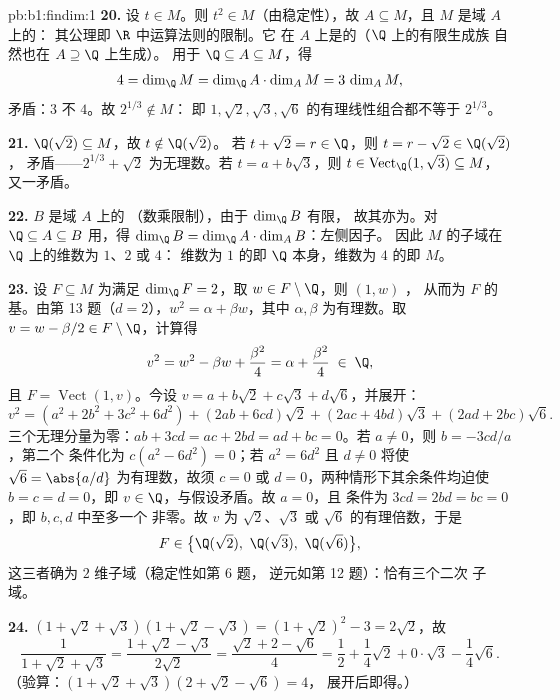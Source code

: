 \begin{solution}{pb:b1:findim:1}
\textbf{20.} 设 $t \in M$。则 $t^2 \in M$（由稳定性），故
$A \subseteq M$，且 $M$ 是域 $A$ 上的：
其公理即 $\R$ 中运算法则的限制。它
在 $A$ 上是的（$\Q$ 上的有限生成族
自然也在 $A \supseteq \Q$ 上生成）。
用于 $\Q \subseteq A \subseteq M$，得
\[
4 = \dim_\Q M = \dim_\Q A \cdot \dim_A M = 3\,\dim_A M ,
\]
矛盾：$3$ 不 $4$。故 $2^{1/3} \notin M$：
即 $1, \sqrt2, \sqrt3, \sqrt6$ 的有理线性组合都不等于
$2^{1/3}$。

\textbf{21.} $\Q(\sqrt2) \subseteq M$，故 $t \notin \Q(\sqrt2)$。
若 $t + \sqrt2 = r \in \Q$，则 $t = r - \sqrt2 \in \Q(\sqrt2)$，
矛盾——$2^{1/3} + \sqrt2$ 为无理数。若 $t = a +
b\sqrt3$，则 $t \in \operatorname{Vect}_\Q(1, \sqrt3) \subseteq
M$，又一矛盾。

\textbf{22.} $B$ 是域 $A$ 上的
（数乘限制），由于 $\dim_\Q B$ 有限，
故其亦为。对 $\Q \subseteq A \subseteq B$ 用，得
$\dim_\Q B = \dim_\Q A \cdot \dim_A B$：左侧因子。
因此 $M$ 的子域在 $\Q$ 上的维数为 $1$、$2$ 或 $4$：
维数为 $1$ 的即 $\Q$ 本身，维数为 $4$ 的即 $M$。

\textbf{23.} 设 $F \subseteq M$ 为满足 $\dim_\Q F =
2$，取 $w \in F \setminus \Q$，则 $(1, w)$ ，
从而为 $F$ 的基。由第 13 题（$d = 2$），$w^2 = \alpha + \beta w$，其中
$\alpha, \beta$ 为有理数。取 $v = w - \beta/2 \in F
\setminus \Q$，计算得
\[
v^2 = w^2 - \beta w + \frac{\beta^2}4 = \alpha + \frac{\beta^2}4
\;\in\; \Q,
\]
且 $F = \operatorname{Vect}(1, v)$。今设 $v = a + b\sqrt2 +
c\sqrt3 + d\sqrt6$，并展开：
\[
v^2 = (a^2 + 2b^2 + 3c^2 + 6d^2)
+ (2ab + 6cd)\sqrt2 + (2ac + 4bd)\sqrt3 + (2ad + 2bc)\sqrt6 .
\]
三个无理分量为零：$ab + 3cd = ac + 2bd =
ad + bc = 0$。若 $a \neq 0$，则 $b = -3cd/a$，第二个
条件化为 $c(a^2 - 6d^2) = 0$；若 $a^2 = 6d^2$ 且 $d
\neq 0$ 将使 $\sqrt6 = \abs{a/d}$ 为有理数，故须 $c = 0$
或 $d = 0$，两种情形下其余条件均迫使 $b =
c = d = 0$，即 $v \in \Q$，与假设矛盾。故 $a = 0$，且
条件为 $3cd = 2bd = bc = 0$，即 $b, c, d$ 中至多一个
非零。故 $v$ 为 $\sqrt2$、$\sqrt3$
或 $\sqrt6$ 的有理倍数，于是
\[
F \in \bigl\{\Q(\sqrt2),\ \Q(\sqrt3),\ \Q(\sqrt6)\bigr\} ,
\]
这三者确为 $2$ 维子域（稳定性如第 6 题，
逆元如第 12 题）：恰有三个二次
子域。

\textbf{24.} $(1 + \sqrt2 + \sqrt3)(1 + \sqrt2 - \sqrt3) = (1 +
\sqrt2)^2 - 3 = 2\sqrt2$，故
\[
\frac1{1 + \sqrt2 + \sqrt3}
= \frac{1 + \sqrt2 - \sqrt3}{2\sqrt2}
= \frac{\sqrt2 + 2 - \sqrt6}{4}
= \frac12 + \frac14\sqrt2 + 0\cdot\sqrt3 - \frac14\sqrt6 .
\]
（验算：$(1 + \sqrt2 + \sqrt3)(2 + \sqrt2 - \sqrt6) = 4$，
展开后即得。）


\end{solution}

